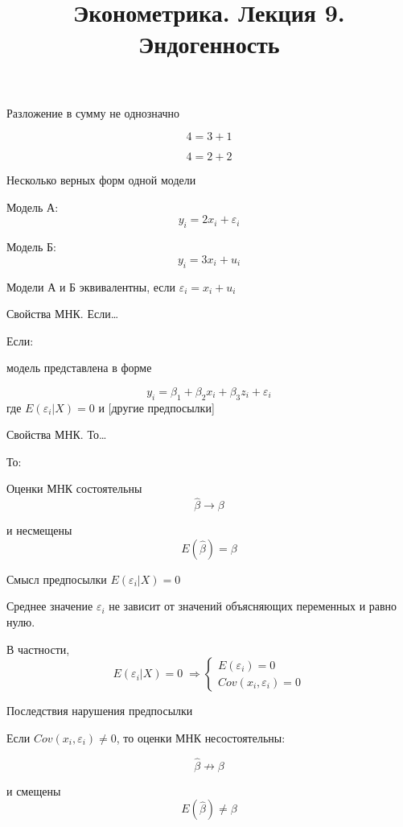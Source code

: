 \documentclass[ignorenonframetext,]{beamer}
\title{Эконометрика. Лекция 9. Эндогенность}
\date{}
\begin{document}
\frame{\titlepage}

\begin{frame}{Разложение в сумму не однозначно}

\[
4 = 3 + 1
\]

\[
4 = 2 + 2
\]

\end{frame}

\begin{frame}{Несколько верных форм одной модели}

Модель А: \[
y_i=2x_i + \varepsilon_i
\]

Модель Б: \[
y_i=3x_i + u_i
\]

Модели А и Б эквивалентны, если \(\varepsilon_i=x_i+u_i\)

\end{frame}

\begin{frame}{Свойства МНК. Если\ldots{}}

Если:

модель представлена в форме

\[
y_i=\beta_1 + \beta_2 x_i + \beta_3 z_i + \varepsilon_i
\] где \(E(\varepsilon_i | X)=0\) и {[}другие предпосылки{]}

\end{frame}

\begin{frame}{Свойства МНК. То\ldots{}}

То:

Оценки МНК состоятельны \[
\hat{\beta} \to \beta
\]

и несмещены \[
E(\hat{\beta})=\beta
\]

\end{frame}

\begin{frame}{Смысл предпосылки \(E(\varepsilon_i | X)=0\)}

Среднее значение \(\varepsilon_i\) не зависит от значений объясняющих
переменных и равно нулю.

В частности, \[
E(\varepsilon_i | X)=0   \; \Rightarrow 
\begin{cases}
E(\varepsilon_i)=0 \\ 
Cov(x_i,\varepsilon_i)=0
\end{cases}
\]

\end{frame}

\begin{frame}{Последствия нарушения предпосылки}

Если \(Cov(x_i, \varepsilon_i) \neq 0\), то оценки МНК несостоятельны:

\[
\hat{\beta} \not \to \beta
\]

и смещены \[
E(\hat{\beta}) \neq \beta
\]

\end{frame}
\end{document}
